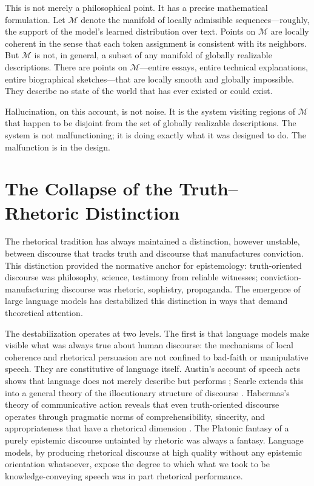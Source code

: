 \documentclass[11pt, oneside]{article}
\begin{document}
This is not merely a philosophical point. It has a precise mathematical formulation. Let $\mathcal{M}$ denote the manifold of locally admissible sequences---roughly, the support of the model's learned distribution over text. Points on $\mathcal{M}$ are locally coherent in the sense that each token assignment is consistent with its neighbors. But $\mathcal{M}$ is not, in general, a subset of any manifold of globally realizable descriptions. There are points on $\mathcal{M}$---entire essays, entire technical explanations, entire biographical sketches---that are locally smooth and globally impossible. They describe no state of the world that has ever existed or could exist.

Hallucination, on this account, is not noise. It is the system visiting regions of $\mathcal{M}$ that happen to be disjoint from the set of globally realizable descriptions. The system is not malfunctioning; it is doing exactly what it was designed to do. The malfunction is in the design.

\section{The Collapse of the Truth--Rhetoric Distinction}

The rhetorical tradition has always maintained a distinction, however unstable, between discourse that tracks truth and discourse that manufactures conviction. This distinction provided the normative anchor for epistemology: truth-oriented discourse was philosophy, science, testimony from reliable witnesses; conviction-manufacturing discourse was rhetoric, sophistry, propaganda. The emergence of large language models has destabilized this distinction in ways that demand theoretical attention.

The destabilization operates at two levels. The first is that language models make visible what was always true about human discourse: the mechanisms of local coherence and rhetorical persuasion are not confined to bad-faith or manipulative speech. They are constitutive of language itself. Austin's account of speech acts shows that language does not merely describe but performs \cite{austin1962}; Searle extends this into a general theory of the illocutionary structure of discourse \cite{searle1969}. Habermas's theory of communicative action reveals that even truth-oriented discourse operates through pragmatic norms of comprehensibility, sincerity, and appropriateness that have a rhetorical dimension \cite{habermas1984}. The Platonic fantasy of a purely epistemic discourse untainted by rhetoric was always a fantasy. Language models, by producing rhetorical discourse at high quality without any epistemic orientation whatsoever, expose the degree to which what we took to be knowledge-conveying speech was in part rhetorical performance.
\end{document}
